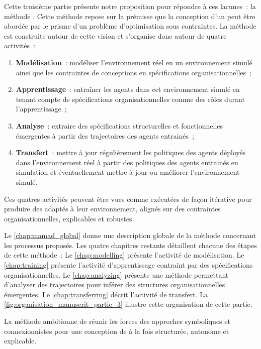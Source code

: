 \noindent
Cette troisième partie présente notre proposition pour répondre à ces lacunes~: la méthode . Cette méthode repose sur la prémisse que la conception d'un  peut être abordée par le prisme d'un problème d'optimisation sous contraintes. La méthode est construite autour de cette vision et s'organise donc autour de quatre activités~:

\begin{enumerate}
    \item \textbf{Modélisation}~: modéliser l'environnement réel en un environnement simulé ainsi que les contraintes de conceptions en spécifications organisationnelles~;
    \item \textbf{Apprentissage}~: entraîner les agents dans cet environnement simulé en tenant compte de spécifications organisationnelles comme des rôles durant l'apprentissage~;
    \item \textbf{Analyse}~: extraire des spécifications structurelles et fonctionnelles émergentes à partir des trajectoires des agents entrainés~;
    \item \textbf{Transfert}~: mettre à jour régulièrement les politiques des agents déployés dans l'environnement réel à partir des politiques des agents entrainés en simulation et éventuellement mettre à jour ou améliorer l'environnement simulé.
\end{enumerate}

\noindent
Ces quatres activités peuvent être vues comme exécutées de façon itérative pour produire des  adaptés à leur environnement, alignés sur des contraintes organisationnelles, explicables et robustes.

\medskip

\noindent
Le \autoref{chap:mamad_global} donne une description globale de la méthode concernant les processus proposés. Les quatre chapitres restants détaillent chacune des étapes de cette méthode~:
Le \autoref{chap:modelling} présente l'activité de modélisation.
Le \autoref{chap:training} présente l'activité d'apprentissage contraint par des spécifications organisationnelles.
Le \autoref{chap:analyzing} présente une méthode permettant d'analyser des trajectoires pour inférer des structures organisationnelles émergentes.
Le \autoref{chap:transferring} décrit l'activité de transfert.
La \autoref{fig:organisation_manuscrit_partie_3} illustre cette organisation de cette partie.

La méthode  ambitionne de réunir les forces des approches symboliques et connexionnistes pour une conception de  à la fois structurée, autonome et explicable.

